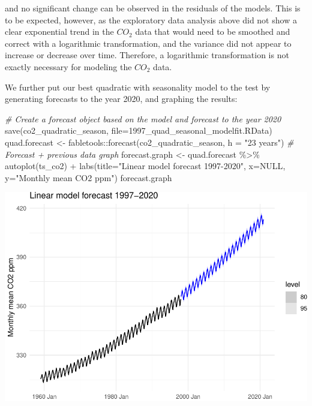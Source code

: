 \documentclass[AER]{AEA}
\newenvironment{Shaded}{\begin{snugshade}}{\end{snugshade}}
\newcommand{\AttributeTok}[1]{\textcolor[rgb]{0.77,0.63,0.00}{#1}}
\newcommand{\CommentTok}[1]{\textcolor[rgb]{0.56,0.35,0.01}{\textit{#1}}}
\newcommand{\ConstantTok}[1]{\textcolor[rgb]{0.00,0.00,0.00}{#1}}
\newcommand{\FunctionTok}[1]{\textcolor[rgb]{0.00,0.00,0.00}{#1}}
\newcommand{\NormalTok}[1]{#1}
\newcommand{\OtherTok}[1]{\textcolor[rgb]{0.56,0.35,0.01}{#1}}
\newcommand{\SpecialCharTok}[1]{\textcolor[rgb]{0.00,0.00,0.00}{#1}}
\newcommand{\StringTok}[1]{\textcolor[rgb]{0.31,0.60,0.02}{#1}}
\begin{document}
and no significant change can be observed in the residuals of the
models. This is to be expected, however, as the exploratory data
analysis above did not show a clear exponential trend in the \(CO_2\)
data that would need to be smoothed and correct with a logarithmic
transformation, and the variance did not appear to increase or decrease
over time. Therefore, a logarithmic transformation is not exactly
necessary for modeling the \(CO_2\) data.

We further put our best quadratic with seasonality model to the test by
generating forecasts to the year 2020, and graphing the results:

\begin{Shaded}
\begin{Highlighting}[]
\CommentTok{\# Create a forecast object based on the model and forecast to the year 2020}
\FunctionTok{save}\NormalTok{(co2\_quadratic\_season, }\AttributeTok{file=}\StringTok{\textquotesingle{}1997\_quad\_seasonal\_modelfit.RData\textquotesingle{}}\NormalTok{)}
\NormalTok{quad.forecast }\OtherTok{\textless{}{-}}\NormalTok{ fabletools}\SpecialCharTok{::}\FunctionTok{forecast}\NormalTok{(co2\_quadratic\_season, }\AttributeTok{h =} \StringTok{"23 years"}\NormalTok{)}
\CommentTok{\# Forecast + previous data graph}
\NormalTok{forecast.graph }\OtherTok{\textless{}{-}}\NormalTok{ quad.forecast }\SpecialCharTok{\%\textgreater{}\%} \FunctionTok{autoplot}\NormalTok{(ts\_co2) }\SpecialCharTok{+} \FunctionTok{labs}\NormalTok{(}\AttributeTok{title=}\StringTok{"Linear model forecast 1997{-}2020"}\NormalTok{, }\AttributeTok{x=}\ConstantTok{NULL}\NormalTok{, }\AttributeTok{y=}\StringTok{"Monthly mean CO2 ppm"}\NormalTok{)}
\NormalTok{forecast.graph}
\end{Highlighting}
\end{Shaded}

\includegraphics{co2_1997_Qian_files/figure-latex/Forecast till 2020-1.pdf}
\end{document}
